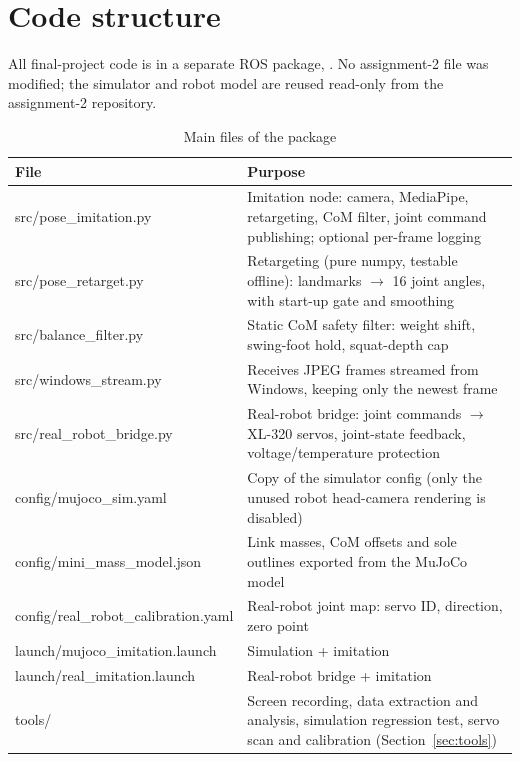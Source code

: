 \documentclass[11pt,a4paper]{article}
\newcommand{\code}[1]{\texttt{\detokenize{#1}}}
\begin{document}
\section{Code structure}
All final-project code is in a separate ROS package, . No assignment-2 file was modified; the simulator and robot model are reused read-only from the assignment-2 repository.

\begin{table}[H]
\centering\small
\begin{tabularx}{\textwidth}{>{\ttfamily}p{6.1cm}Y}
\toprule
\normalfont File & Purpose \\
\midrule
src/pose\_imitation.py & Imitation node: camera, MediaPipe, retargeting, CoM filter, joint command publishing; optional per-frame logging \\
src/pose\_retarget.py & Retargeting (pure numpy, testable offline): landmarks $\rightarrow$ 16 joint angles, with start-up gate and smoothing \\
src/balance\_filter.py & Static CoM safety filter: weight shift, swing-foot hold, squat-depth cap \\
src/windows\_stream.py & Receives JPEG frames streamed from Windows, keeping only the newest frame \\
src/real\_robot\_bridge.py & Real-robot bridge: joint commands $\rightarrow$ XL-320 servos, joint-state feedback, voltage/temperature protection \\
config/mujoco\_sim.yaml & Copy of the simulator config (only the unused robot head-camera rendering is disabled) \\
config/mini\_mass\_model.json & Link masses, CoM offsets and sole outlines exported from the MuJoCo model \\
config/real\_robot\_calibration.yaml & Real-robot joint map: servo ID, direction, zero point \\
launch/mujoco\_imitation.launch & Simulation + imitation \\
launch/real\_imitation.launch & Real-robot bridge + imitation \\
tools/ & Screen recording, data extraction and analysis, simulation regression test, servo scan and calibration (Section~\ref{sec:tools}) \\
\bottomrule
\end{tabularx}
\caption{Main files of the \code{final_project} package}
\end{table}
\end{document}

